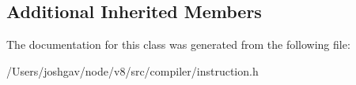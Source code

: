 \subsection*{Additional Inherited Members}


The documentation for this class was generated from the following file\+:\begin{DoxyCompactItemize}
\item 
/\+Users/joshgav/node/v8/src/compiler/instruction.\+h\end{DoxyCompactItemize}
